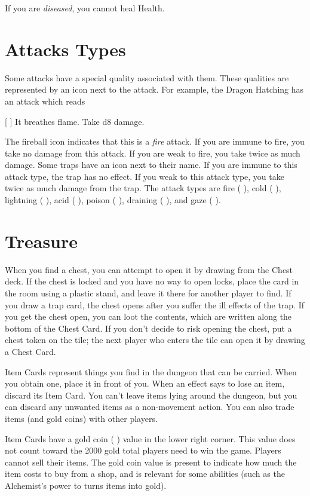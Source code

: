 \documentclass{book}
\begin{document}
If you are \emph{diseased}, you cannot heal Health.

\section{Attacks Types}
Some attacks have a special quality associated with them. These qualities are represented by an icon next to the attack. For example, the Dragon Hatching has an attack which reads

[ ] It breathes flame. Take d8 damage.

The fireball icon indicates that this is a \emph{fire} attack. If you are immune to fire, you take no damage from this attack.  If you are weak to fire, you take twice as much damage. Some traps have an icon next to their name. If you are immune to this attack type, the trap has no effect. If you weak to this attack type, you take twice as much damage from the trap.
The attack types are fire ( ), cold ( ), lightning ( ), acid ( ), poison ( ), draining ( ), and gaze ( ).

\section{Treasure}
When you find a chest, you can attempt to open it by drawing from the Chest deck. If the chest is locked and you have no way to open locks, place the card in the room using a plastic stand, and leave it there for another player to find. If you draw a trap card, the chest opens after you suffer the ill effects of the trap. If you get the chest open, you can loot the contents, which are written along the bottom of the Chest Card. If you don’t decide to risk opening the chest, put a chest token on the tile; the next player who enters the tile can open it by drawing a Chest Card.

Item Cards represent things you find in the dungeon that can be carried. When you obtain one, place it in front of you. When an effect says to lose an item, discard its Item Card. You can’t leave items lying around the dungeon, but you can discard any unwanted items as a non-movement action. You can also trade items (and gold coins) with other players.

Item Cards have a gold coin ( ) value in the lower right corner. This value does not count toward the 2000 gold total players need to win the game. Players cannot sell their items. The gold coin value is present to indicate how much the item costs to buy from a shop, and is relevant for some abilities (such as the Alchemist’s power to turns items into gold).
\end{document}
